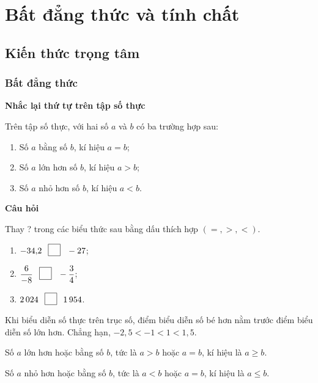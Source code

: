 \section{Bất đẳng thức và tính chất}

\begin{lesson}
    \subsection{Kiến thức trọng tâm}

    \subsubsection{Bất đẳng thức}

    \textbf{Nhắc lại thứ tự trên tập số thực}

    \begin{keyconcept}
        Trên tập số thực, với hai số $a$ và $b$ có ba trường hợp sau:
        \begin{enumerate}[label=\alph*)]
            \item Số $a$ bằng số $b$, kí hiệu $a=b$;
            \item Số $a$ lớn hơn số $b$, kí hiệu $a>b$;
            \item Số $a$ nhỏ hơn số $b$, kí hiệu $a<b$.
        \end{enumerate}
    \end{keyconcept}

    \textbf{Câu hỏi}

    Thay ? trong các biểu thức sau bằng dấu thích hợp $(=,>,<)$.
    \begin{enumerate}[label=\alph*)]
        \item $-34{,}2\ \answerbox\ -27$;
        \item $\dfrac{6}{-8}\ \answerbox\ -\dfrac{3}{4}$;
        \item $2\,024\ \answerbox\ 1\,954$.
    \end{enumerate}

    \begin{keyconcept}
        Khi biểu diễn số thực trên trục số, điểm biểu diễn số bé hơn nằm trước điểm biểu diễn số lớn hơn. Chẳng hạn, $-2{,}5<-1<1<1{,}5$.

        Số $a$ lớn hơn hoặc bằng số $b$, tức là $a>b$ hoặc $a=b$, kí hiệu là $a\ge b$.

        Số $a$ nhỏ hơn hoặc bằng số $b$, tức là $a<b$ hoặc $a=b$, kí hiệu là $a\le b$.
    \end{keyconcept}


\end{lesson}
